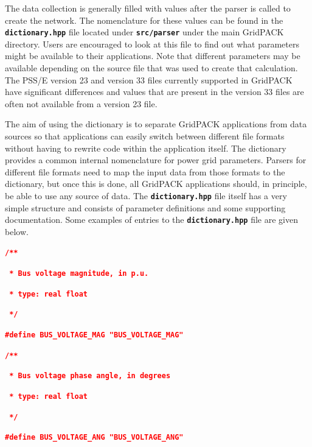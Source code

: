 \documentclass[12pt]{report} %
\begin{document}
The data collection is generally filled with values after the parser is called to create the network. The nomenclature for these values can be found in the \texttt{\textbf{dictionary.hpp}} file located under \texttt{\textbf{src/parser}} under the main GridPACK directory. Users are encouraged to look at this file to find out what parameters might be available to their applications. Note that different parameters may be available depending on the source file that was used to create that calculation. The PSS/E version 23 and version 33 files currently supported in GridPACK have significant differences and values that are present in the version 33 files are often not available from a version 23 file.

The aim of using the dictionary is to separate GridPACK applications from data sources so that applications can easily switch between different file formats without having to rewrite code within the application itself. The dictionary provides a common internal nomenclature for power grid parameters. Parsers for different file formats need to map the input data from those formats to the dictionary, but once this is done, all GridPACK applications should, in principle, be able to use any source of data.
The \texttt{\textbf{dictionary.hpp}} file itself has a very simple structure and consists of parameter definitions and some supporting documentation. Some examples of entries to the \texttt{\textbf{dictionary.hpp}} file are given below.

\textcolor{red}{\texttt{\textbf{/**}}}

\textcolor{red}{\texttt{\textbf{ * Bus voltage magnitude, in p.u.}}}

\textcolor{red}{\texttt{\textbf{ * type: real float}}}

\textcolor{red}{\texttt{\textbf{ */}}}

\textcolor{red}{\texttt{\textbf{\#define BUS\_VOLTAGE\_MAG "BUS\_VOLTAGE\_MAG"}}}

\textcolor{red}{\texttt{\textbf{}}}

\textcolor{red}{\texttt{\textbf{/**}}}

\textcolor{red}{\texttt{\textbf{ * Bus voltage phase angle, in degrees}}}

\textcolor{red}{\texttt{\textbf{ * type: real float}}}

\textcolor{red}{\texttt{\textbf{ */}}}

\textcolor{red}{\texttt{\textbf{\#define BUS\_VOLTAGE\_ANG "BUS\_VOLTAGE\_ANG"}}}

\textcolor{red}{\texttt{\textbf{}}}
\end{document}
